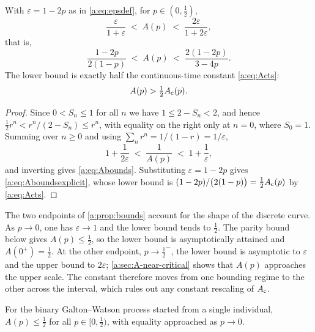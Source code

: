 \begin{proposition}
\label{a:prop:bounds}
With $\varepsilon=1-2p$ as in \cref{a:eq:epsdef}, for $p\in(0,\tfrac12)$,
\begin{equation}
\label{a:eq:Abounds}
\frac{\varepsilon}{1+\varepsilon} \;<\; A(p) \;<\; \frac{2\varepsilon}{1+2\varepsilon},
\end{equation}
that is,
\begin{equation}
\label{a:eq:Aboundsexplicit}
\frac{1-2p}{2(1-p)} \;<\; A(p) \;<\; \frac{2(1-2p)}{3-4p} .
\end{equation}
The lower bound is exactly half the continuous-time constant \cref{a:eq:Acts}:
\begin{equation}
\label{a:eq:halfAc}
A(p) > \tfrac12A_{\mathrm{c}}(p) .
\end{equation}
\end{proposition}

\begin{proof}
Since $0<S_n\le1$ for all $n$ we have $1\le2-S_n<2$, and hence
$\tfrac12r^n < r^n/(2-S_n)\le r^n$, with equality on the right only at $n=0$, where
$S_0=1$. Summing over $n\ge0$ and using $\sum_nr^n = 1/(1-r) = 1/\varepsilon$,
\begin{equation*}
1+\frac{1}{2\varepsilon} \;<\; \frac{1}{A(p)} \;<\; 1+\frac{1}{\varepsilon},
\end{equation*}
and inverting gives \cref{a:eq:Abounds}. Substituting $\varepsilon=1-2p$ gives
\cref{a:eq:Aboundsexplicit}, whose lower bound is
$(1-2p)/\bigl(2(1-p)\bigr) = \tfrac12A_{\mathrm{c}}(p)$ by \cref{a:eq:Acts}.
\end{proof}

The two endpoints of \cref{a:prop:bounds} account for the shape of the discrete
curve.  As $p\to0$, one has $\varepsilon\to1$ and the lower bound tends to
$\tfrac12$.  The parity bound below gives $A(p)\leq\tfrac12$, so the lower bound
is asymptotically attained and $A(0^+)=\tfrac12$.  At the other endpoint,
$p\to\tfrac12^-$, the lower bound is asymptotic to $\varepsilon$ and the upper
bound to $2\varepsilon$; \cref{a:sec:A-near-critical} shows that $A(p)$ approaches
the upper scale.  The constant therefore moves from one bounding regime to the
other across the interval, which rules out any constant rescaling of $A_{\mathrm{c}}$.

\begin{proposition}
\label{a:prop:parity}
For the binary Galton--Watson process started from a single individual,
$A(p)\le\tfrac12$ for all $p\in[0,\tfrac12)$, with equality approached as $p\to0$.
\end{proposition}

